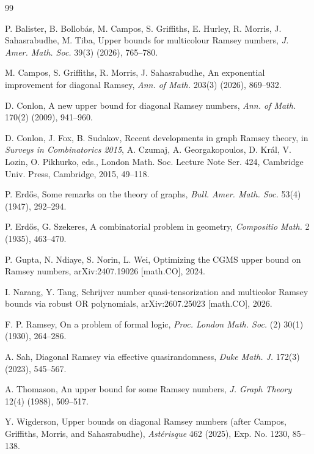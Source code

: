 \documentclass[twoside,12pt]{article}
\theoremstyle{definition}
\theoremstyle{remark}
\newcommand{\1}{\mathbf 1}
\begin{document}
\begin{thebibliography}{99}

P. Balister, B. Bollob\'{a}s, M. Campos, S. Griffiths, E. Hurley,
R. Morris, J. Sahasrabudhe, M. Tiba,
Upper bounds for multicolour Ramsey numbers,
\emph{J. Amer. Math. Soc.} 39(3) (2026), 765--780.

M. Campos, S. Griffiths, R. Morris, J. Sahasrabudhe,
An exponential improvement for diagonal Ramsey,
\emph{Ann. of Math.} 203(3) (2026), 869--932.

D. Conlon,
A new upper bound for diagonal Ramsey numbers,
\emph{Ann. of Math.} 170(2) (2009), 941--960.

D. Conlon, J. Fox, B. Sudakov,
Recent developments in graph Ramsey theory,
in \emph{Surveys in Combinatorics 2015},
A. Czumaj, A. Georgakopoulos, D. Kr\'{a}l, V. Lozin, O. Pikhurko, eds.,
London Math. Soc. Lecture Note Ser. 424,
Cambridge Univ. Press, Cambridge, 2015, 49--118.

P. Erd\H{o}s,
Some remarks on the theory of graphs,
\emph{Bull. Amer. Math. Soc.} 53(4) (1947), 292--294.

P. Erd\H{o}s, G. Szekeres,
A combinatorial problem in geometry,
\emph{Compositio Math.} 2 (1935), 463--470.

P. Gupta, N. Ndiaye, S. Norin, L. Wei,
Optimizing the CGMS upper bound on Ramsey numbers,
arXiv:2407.19026 [math.CO], 2024.

I. Narang, Y. Tang,
Schrijver number quasi-tensorization and multicolor Ramsey bounds via
robust OR polynomials,
arXiv:2607.25023 [math.CO], 2026.

F. P. Ramsey,
On a problem of formal logic,
\emph{Proc. London Math. Soc.} (2) 30(1) (1930), 264--286.

A. Sah,
Diagonal Ramsey via effective quasirandomness,
\emph{Duke Math. J.} 172(3) (2023), 545--567.

A. Thomason,
An upper bound for some Ramsey numbers,
\emph{J. Graph Theory} 12(4) (1988), 509--517.

Y. Wigderson,
Upper bounds on diagonal Ramsey numbers
(after Campos, Griffiths, Morris, and Sahasrabudhe),
\emph{Ast\'{e}risque} 462 (2025), Exp. No. 1230, 85--138.

\end{thebibliography}
\end{document}

